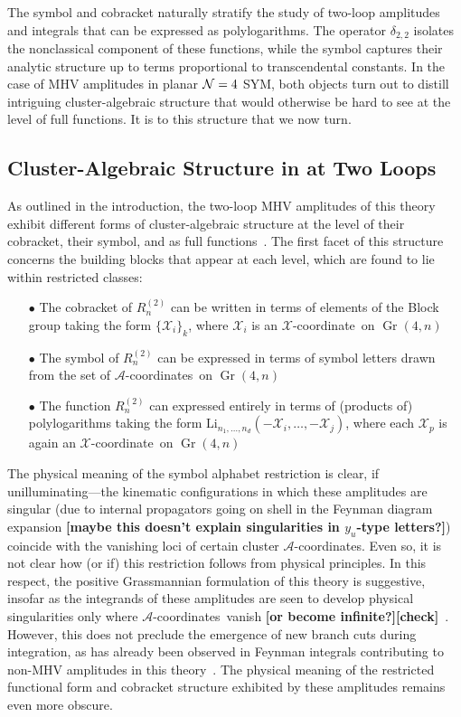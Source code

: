 \documentclass[11pt]{article}
\DeclareMathOperator{\Gr}{Gr}
\def\x{\mathcal{X}}
\def\xcoord{$\mathcal{X}$-coordinate}
\def\acoords{$\mathcal{A}$-coordinates}
\def\draftnote#1{{\bf [#1]}}
\begin{document}
The symbol and cobracket naturally stratify the study of two-loop amplitudes and integrals that can be expressed as polylogarithms. The operator $\delta_{2,2}$ isolates the nonclassical component of these functions, while the symbol captures their analytic structure up to terms proportional to transcendental constants. In the case of MHV amplitudes in planar ${\cal N} = 4$ SYM, both objects turn out to distill intriguing cluster-algebraic structure that would otherwise be hard to see at the level of full functions. It is to this structure that we now turn.

\subsection{Cluster-Algebraic Structure in at Two Loops}\label{sec:cluster-algebra-R2n}


As outlined in the introduction, the two-loop MHV amplitudes of this theory exhibit different forms of cluster-algebraic structure at the level of their cobracket, their symbol, and as full functions~\cite{Golden:2013xva,Golden:2014xqa,Golden:2014xqf,Golden:2014pua}. The first facet of this structure concerns the building blocks that appear at each level, which are found to lie within restricted classes:
\begin{itemize}
\item[$\bullet$] The cobracket of $R^{(2)}_n$ can be written in terms of elements of the Block group taking the form $\{\mathcal{X}_i \}_k$, where $\x_i$ is an \xcoord\ on $\Gr(4,n)$
\item[$\bullet$] The symbol of $R^{(2)}_n$ can be expressed in terms of symbol letters drawn from the set of \acoords\ on $\Gr(4,n)$
\item[$\bullet$] The function $R^{(2)}_n$ can expressed entirely in terms of (products of) polylogarithms taking the form $\text{Li}_{n_1,\dots,n_d}(-\mathcal{X}_i,\dots,-\mathcal{X}_j)$, where each $\x_p$ is again an \xcoord\ on $\Gr(4,n)$
\end{itemize}
The physical meaning of the symbol alphabet restriction is clear, if unilluminating---the kinematic configurations in which these amplitudes are singular (due to internal propagators going on shell in the Feynman diagram expansion \draftnote{maybe this doesn't explain singularities in $y_u$-type letters?}) coincide with the vanishing loci of certain cluster \acoords. Even so, it is not clear how (or if) this restriction follows from physical principles. In this respect, the positive Grassmannian formulation of this theory is suggestive, insofar as the integrands of these amplitudes are seen to develop physical singularities only where \acoords\ vanish \draftnote{or become infinite?}\draftnote{check}~\cite{ArkaniHamed:2012nw}. However, this does not preclude the emergence of new branch cuts during integration, as has already been observed in Feynman integrals contributing to non-MHV amplitudes in this theory~\cite{Bourjaily:2018aeq,Henn:2018cdp}. The physical meaning of the restricted functional form and cobracket structure exhibited by these amplitudes remains even more obscure. 
\end{document}

